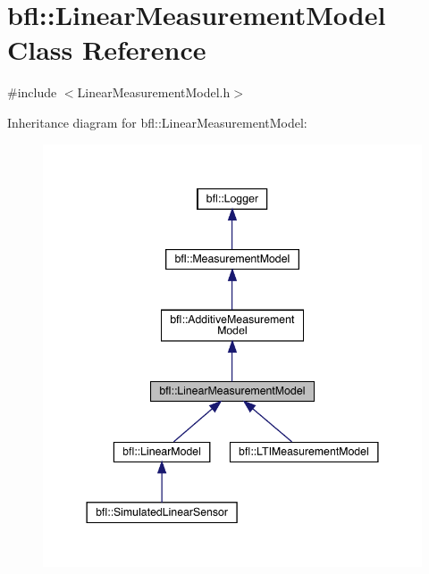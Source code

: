 \hypertarget{classbfl_1_1LinearMeasurementModel}{}\section{bfl\+:\+:Linear\+Measurement\+Model Class Reference}
\label{classbfl_1_1LinearMeasurementModel}


{\ttfamily \#include $<$Linear\+Measurement\+Model.\+h$>$}



Inheritance diagram for bfl\+:\+:Linear\+Measurement\+Model\+:
\nopagebreak
\begin{figure}[H]
\begin{center}
\leavevmode
\includegraphics[width=344pt]{classbfl_1_1LinearMeasurementModel__inherit__graph}
\end{center}
\end{figure}
